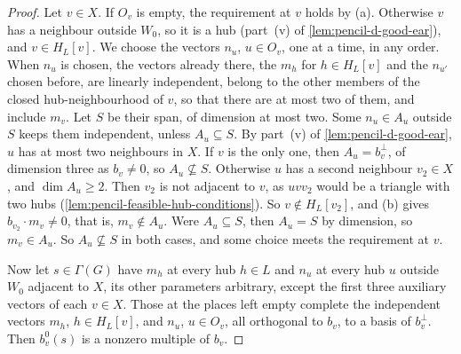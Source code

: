 \begin{proof}
  Let $v \in X$. If $O_v$ is empty, the requirement at $v$ holds by (a).
  Otherwise $v$ has a neighbour outside $W_0$, so it is a hub (part~(v)
  of \cref{lem:pencil-d-good-ear}), and $v \in H_L[v]$. We choose the
  vectors $n_u$, $u \in O_v$, one at a time, in any order. When $n_u$ is
  chosen, the vectors already there, the $m_h$ for $h \in H_L[v]$ and the
  $n_{u'}$ chosen before, are linearly independent, belong to the other
  members of the closed hub-neighbourhood of $v$, so that there are at
  most two of them, and include $m_v$. Let $S$ be their span, of
  dimension at most two. Some $n_u \in A_u$ outside $S$ keeps them
  independent, unless $A_u \subseteq S$. By part~(v) of
  \cref{lem:pencil-d-good-ear}, $u$ has at most two neighbours in $X$. If
  $v$ is the only one, then $A_u = b_v^{\perp}$, of dimension three as
  $b_v \ne 0$, so $A_u \not\subseteq S$. Otherwise $u$ has a second
  neighbour $v_2 \in X$, and $\dim A_u \ge 2$. Then $v_2$ is not adjacent
  to $v$, as $u v v_2$ would be a triangle with two hubs
  (\cref{lem:pencil-feasible-hub-conditions}). So $v \notin H_L[v_2]$,
  and (b) gives $b_{v_2} \cdot m_v \ne 0$, that is, $m_v \notin A_u$.
  Were $A_u \subseteq S$, then $A_u = S$ by dimension, so $m_v \in A_u$.
  So $A_u \not\subseteq S$ in both cases, and some choice meets the
  requirement at $v$.

  Now let $s \in \Gamma(G)$ have $m_h$ at every hub $h \in L$ and $n_u$ at
  every hub $u$ outside $W_0$ adjacent to $X$, its other parameters
  arbitrary, except the first three auxiliary vectors of each $v \in X$.
  Those at the places left empty complete the independent vectors $m_h$,
  $h \in H_L[v]$, and $n_u$,
  $u \in O_v$, all orthogonal to $b_v$, to a basis of $b_v^{\perp}$. Then
  $b^0_v(s)$ is a nonzero multiple of $b_v$.
\end{proof}

